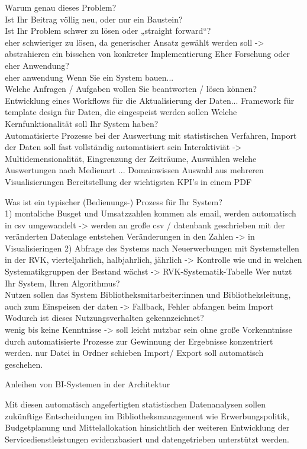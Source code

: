 Warum genau dieses Problem?\\
Ist Ihr Beitrag völlig neu, oder nur ein Baustein?\\
Ist Ihr Problem schwer zu lösen oder „straight forward“?\\
eher schwieriger zu lösen, da generischer Ansatz gewählt werden soll -> abstrahieren ein bisschen von konkreter Implementierung
Eher Forschung oder eher Anwendung?\\
eher anwendung
Wenn Sie ein System bauen...\\
Welche Anfragen / Aufgaben wollen Sie beantworten / lösen können?\\
Entwicklung eines Workflows für die Aktualisierung der Daten...
Framework für template design für Daten, die eingespeist werden sollen
Welche Kernfunktionalität soll Ihr System haben?\\
Automatisierte Prozesse bei der Auswertung mit statistischen Verfahren, Import der Daten soll fast vollständig automatisiert sein
Interaktiviät -> Multidemensionalität, Eingrenzung der Zeiträume, Auswählen welche Auswertungen nach Medienart ... Domainwissen
Auswahl aus mehreren Visualisierungen
Bereitstellung der wichtigsten KPI's in einem PDF

Was ist ein typischer (Bedienungs-) Prozess für Ihr System?\\
1) montaliche Busget und Umsatzzahlen kommen als email, werden automatisch in csv umgewandelt -> werden an große csv / datenbank geschrieben
mit der veränderten Datenlage entstehen Veränderungen in den Zahlen -> in Visualisieringen
2) Abfrage des Systems nach Neuerwerbungen mit Systemstellen in der RVK, vierteljahrlich, halbjahrlich, jährlich -> Kontrolle wie und in welchen Systematikgruppen
der Bestand wächst -> RVK-Systematik-Tabelle
Wer nutzt Ihr System, Ihren Algorithmus?\\
Nutzen sollen das System Bibliotheksmitarbeiter:innen und Bibliotheksleitung, auch zum Einspeisen der daten -> Fallback, Fehler abfangen beim Import
Wodurch ist dieses Nutzungsverhalten gekennzeichnet?\\
wenig bis keine Kenntnisse -> soll leicht nutzbar sein ohne große Vorkenntnisse durch automatisierte Prozesse zur Gewinnung der Ergebnisse konzentriert werden.
nur Datei in Ordner schieben
Import/ Export  soll automatisch geschehen.

Anleihen von BI-Systemen in der Architektur



Mit diesen automatisch angefertigten statistischen Datenanalysen sollen zukünftige
Entscheidungen im Bibliotheksmanagement wie Erwerbungspolitik, Budgetplanung und
Mittelallokation hinsichtlich der weiteren Entwicklung der
Servicedienstleistungen evidenzbasiert und datengetrieben unterstützt werden.

